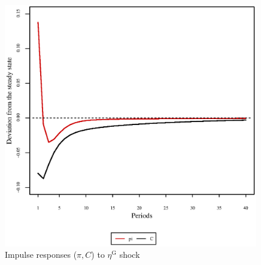 \pagebreak

\begin{figure}[h]
\centering
\begin{minipage}{0.5\textwidth}
\vspace*{-3em}
\centering
\includegraphics[width=0.99\textwidth, scale=0.55]{plots/plot_30.eps}
\caption{Impulse responses ($\pi, C$) to $\eta^{\mathrm{G}}$ shock}
\end{minipage}
\end{figure}
